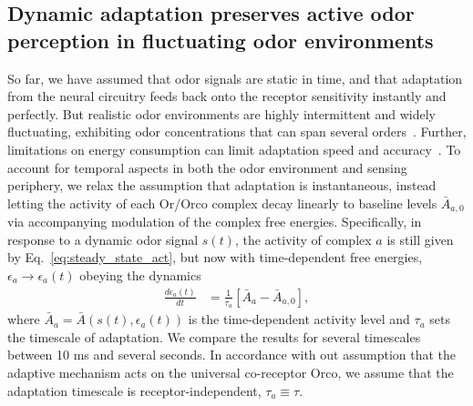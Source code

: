 





\subsection{Dynamic adaptation preserves active odor perception in fluctuating odor environments}
So far, we have assumed that odor signals are static in time, and that adaptation from the neural circuitry feeds back onto the receptor sensitivity instantly and perfectly. But realistic odor environments are highly intermittent and widely fluctuating, exhibiting odor concentrations that can span several orders~\cite{celani}. Further, limitations on energy consumption can limit adaptation speed and accuracy~\cite{ESA}. To account for temporal aspects in both the odor environment and sensing periphery, we relax the assumption that adaptation is instantaneous, instead letting the activity of each Or/Orco complex decay linearly to baseline levels $\bar{A}_{a, 0}$ via accompanying modulation of the complex free energies. Specifically, in response to a dynamic odor signal $s(t)$, the activity of complex $a$ is still given by Eq.~\ref{eq:steady_state_act}, but now with time-dependent free energies, $\epsilon_a \rightarrow \epsilon_a(t)$ obeying the dynamics
\begin{align}
\frac{d\epsilon_a(t)}{dt} &= \frac{1}{\tau_a}\left[\bar{A}_a - \bar {A}_{a,0}\right],
\label{eq:WL_dynamics}
\end{align}
where $\bar {A}_a = \bar{A}(s(t), \epsilon_a(t))$ is the time-dependent activity level and $\tau_a$ sets the timescale of adaptation. We compare the results for several timescales between 10 ms and several seconds. In accordance with out assumption that the adaptive mechanism acts on the universal co-receptor Orco, we assume that the adaptation timescale is receptor-independent, $\tau_a \equiv \tau$. 



